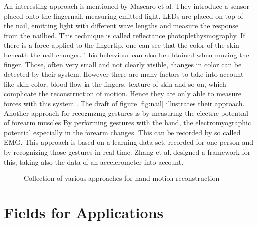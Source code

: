 An interesting approach is mentioned by Mascaro et al. They introduce a sensor placed onto the fingernail, measuring emitted light. LEDs are placed on top of the nail, emitting light with different wave lengths and measure the response from the nailbed. This technique is called reflectance photoplethysmography. If there is a force applied to the fingertip, one can see that the color of the skin beneath the nail changes. This behaviour can also be obtained when moving the finger. Those, often very small and not clearly visible, changes in color can be detected by their system. However there are many factors to take into account like skin color, blood flow in the fingers, texture of skin and so on, which complicate the reconstruction of motion. Hence they are only able to measure forces with this system \cite{mascaro2001photoplethysmograph}. The draft of figure \ref{fig:nail} illustrates their approach.\\
Another approach for recognizing gestures is by measuring the electric potential of forearm muscles \cite{kim2008emg} By performing gestures with the hand, the electromyographic potential especially in the forearm changes. This can be recorded by so called \ac{EMG}. This approach is based on a learning data set, recorded for one person and by recognizing those gestures in real time. Zhang et al. \cite{zhang2011framework} designed a framework for this, taking also the data of an accelerometer into account.

\begin{figure}[h]
	\hfill
	\hfill
	\hfill
	
	\caption{Collection of various approaches for hand motion reconstruction}
	\label{fig:examplesOther}
\end{figure}

\FloatBarrier


\section{Fields for Applications} \label{sec:applications}

